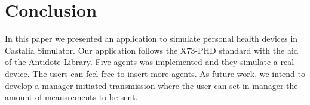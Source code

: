 \section{Conclusion}\label{conclusion}
In this paper we presented an application to simulate personal health devices in Castalia Simulator. Our application follows the X73-PHD standard with the aid of the Antidote Library. Five agents was implemented and they simulate a real device. The users can feel free to insert more agents. As future work, we intend to develop a manager-initiated transmission where the user can set in manager the amount of meausrements to be sent.